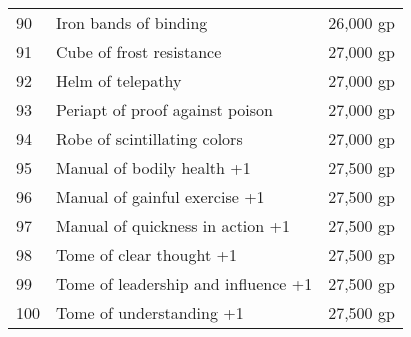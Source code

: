 \begin{table}[]
\begin{tabularx}{\linewidth}{lXl}
90  & Iron bands of binding                       & 26,000 gp    \\
91  & Cube of frost resistance                    & 27,000 gp    \\
92  & Helm of telepathy                           & 27,000 gp    \\
93  & Periapt of proof against poison             & 27,000 gp    \\
94  & Robe of scintillating colors                & 27,000 gp    \\
95  & Manual of bodily health +1                  & 27,500 gp    \\
96  & Manual of gainful exercise +1               & 27,500 gp    \\
97  & Manual of quickness in action +1            & 27,500 gp    \\
98  & Tome of clear thought +1                    & 27,500 gp    \\
99  & Tome of leadership and influence +1         & 27,500 gp    \\
100 & Tome of understanding +1                    & 27,500 gp   
\end{tabularx}
\end{table}

